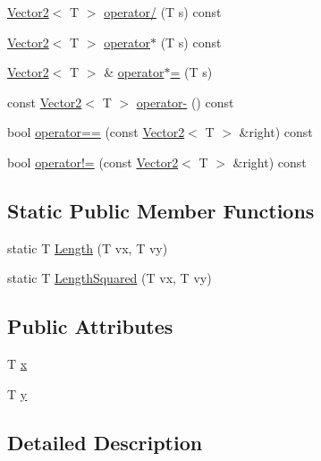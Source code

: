 \begin{DoxyCompactItemize}
\hyperlink{classastu_1_1Vector2}{Vector2}$<$ T $>$ \hyperlink{classastu_1_1Vector2_af2852a5bb5295f1a510e507bc554863d}{operator/} (T s) const
\item 
\hyperlink{classastu_1_1Vector2}{Vector2}$<$ T $>$ \hyperlink{classastu_1_1Vector2_aa9cd4d74e0174cb0995613f989e42f12}{operator$\ast$} (T s) const
\item 
\hyperlink{classastu_1_1Vector2}{Vector2}$<$ T $>$ \& \hyperlink{classastu_1_1Vector2_a3a4e11dd85fbd0e1cda4e8b38b9aea6a}{operator$\ast$=} (T s)
\item 
const \hyperlink{classastu_1_1Vector2}{Vector2}$<$ T $>$ \hyperlink{classastu_1_1Vector2_aaa65baf8ffd013a0401c4875d91337a4}{operator-\/} () const
\item 
bool \hyperlink{classastu_1_1Vector2_ada7f1d693330e7671cb1f951d8011c08}{operator==} (const \hyperlink{classastu_1_1Vector2}{Vector2}$<$ T $>$ \&right) const
\item 
bool \hyperlink{classastu_1_1Vector2_a01b57021e1b027997ecefb3c9b3595d9}{operator!=} (const \hyperlink{classastu_1_1Vector2}{Vector2}$<$ T $>$ \&right) const
\end{DoxyCompactItemize}
\subsection*{Static Public Member Functions}
\begin{DoxyCompactItemize}
\item 
static T \hyperlink{classastu_1_1Vector2_a7fdf839b6c3444121dc6fb2eb88c200e}{Length} (T vx, T vy)
\item 
static T \hyperlink{classastu_1_1Vector2_afbc3ba40ff99e66abbe5db6b5adb6b97}{Length\+Squared} (T vx, T vy)
\end{DoxyCompactItemize}
\subsection*{Public Attributes}
\begin{DoxyCompactItemize}
\item 
T \hyperlink{classastu_1_1Vector2_aa60c30b27742255fbe7053b07a7e76ba}{x}
\item 
T \hyperlink{classastu_1_1Vector2_a6718f5a7005c38830dbd31283a87f5c9}{y}
\end{DoxyCompactItemize}


\subsection{Detailed Description}
